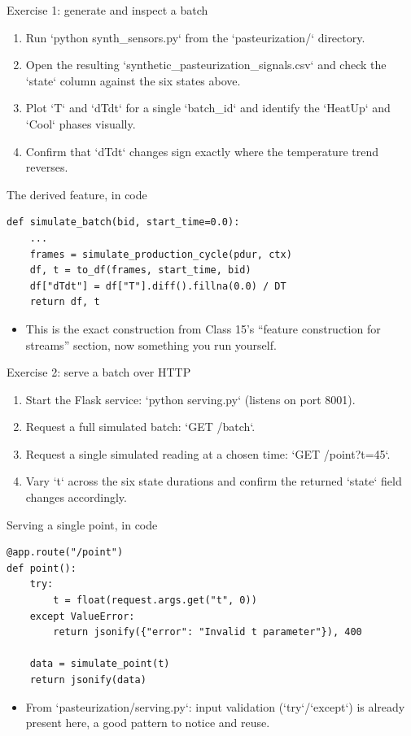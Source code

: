 \begin{frame}{Exercise 1: generate and inspect a batch}
\begin{enumerate}
\item Run `python synth_sensors.py` from the `pasteurization/` directory.
\item Open the resulting `synthetic_pasteurization_signals.csv` and check the `state` column against the six states above.
\item Plot `T` and `dTdt` for a single `batch_id` and identify the `HeatUp` and `Cool` phases visually.
\item Confirm that `dTdt` changes sign exactly where the temperature trend reverses.
\end{enumerate}
\coursefooter
\end{frame}

\begin{frame}[fragile]{The derived feature, in code}
\begin{lstlisting}[style=coursepython]
def simulate_batch(bid, start_time=0.0):
    ...
    frames = simulate_production_cycle(pdur, ctx)
    df, t = to_df(frames, start_time, bid)
    df["dTdt"] = df["T"].diff().fillna(0.0) / DT
    return df, t
\end{lstlisting}
\begin{itemize}
\item This is the exact construction from Class 15's ``feature construction for streams'' section, now something you run yourself.
\end{itemize}
\coursefooter
\end{frame}

\begin{frame}{Exercise 2: serve a batch over HTTP}
\begin{enumerate}
\item Start the Flask service: `python serving.py` (listens on port 8001).
\item Request a full simulated batch: `GET /batch`.
\item Request a single simulated reading at a chosen time: `GET /point?t=45`.
\item Vary `t` across the six state durations and confirm the returned `state` field changes accordingly.
\end{enumerate}
\coursefooter
\end{frame}

\begin{frame}[fragile]{Serving a single point, in code}
\begin{lstlisting}[style=coursepython]
@app.route("/point")
def point():
    try:
        t = float(request.args.get("t", 0))
    except ValueError:
        return jsonify({"error": "Invalid t parameter"}), 400

    data = simulate_point(t)
    return jsonify(data)
\end{lstlisting}
\begin{itemize}
\item From `pasteurization/serving.py`: input validation (`try`/`except`) is already present here, a good pattern to notice and reuse.
\end{itemize}
\coursefooter
\end{frame}

